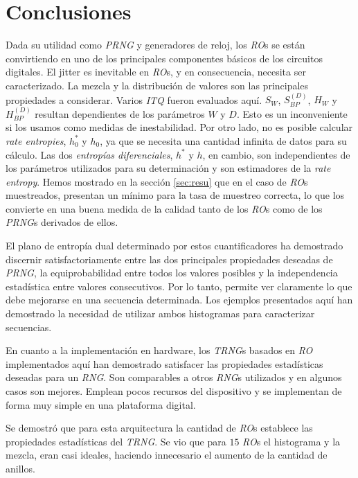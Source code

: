 \section{Conclusiones}

Dada su utilidad como \emph{PRNG} y generadores de reloj, los \emph{RO}s se están convirtiendo en uno de los principales componentes básicos de los circuitos digitales.
El jitter es inevitable en \emph{RO}s, y en consecuencia, necesita ser caracterizado.
La mezcla y la distribución de valores son las principales propiedades a considerar.
Varios \emph{ITQ} fueron evaluados aquí.
$S_W$, $S^{(D)}_{BP}$, $H_W$ y $H^{(D)}_{BP}$ resultan dependientes de los parámetros $W$ y $D$.
Esto es un inconveniente si los usamos como medidas de inestabilidad.
Por otro lado, no es posible calcular \emph{rate entropies}, $h_0^*$ y $h_0$, ya que se necesita una cantidad infinita de datos para su cálculo.
Las dos \emph{entropías diferenciales}, $h^*$ y $h$, en cambio, son independientes de los parámetros utilizados para su determinación y son estimadores de la \emph{rate entropy}.
Hemos mostrado en la sección \ref{sec:resu} que en el caso de \emph{RO}s muestreados, presentan un mínimo para la tasa de muestreo correcta, lo que los convierte en una buena medida de la calidad tanto de los \emph{RO}s como de los \emph{PRNG}s derivados de ellos.

El plano de entropía dual determinado por estos cuantificadores ha demostrado discernir satisfactoriamente entre las dos principales propiedades deseadas de \emph{PRNG}, la equiprobabilidad entre todos los valores posibles y la independencia estadística entre valores consecutivos.
Por lo tanto, permite ver claramente lo que debe mejorarse en una secuencia determinada.
Los ejemplos presentados aquí han demostrado la necesidad de utilizar ambos histogramas para caracterizar secuencias.

En cuanto a la implementación en hardware, los \emph{TRNG}s basados en \emph{RO} implementados aquí han demostrado satisfacer las propiedades estadísticas deseadas para un \emph{RNG}.
Son comparables a otros \emph{RNG}s utilizados y en algunos casos son mejores.
Emplean pocos recursos del dispositivo y se implementan de forma muy simple en una plataforma digital.

Se demostró que para esta arquitectura la cantidad de \emph{RO}s establece las propiedades estadísticas del \emph{TRNG}.
Se vio que para $15$ \emph{RO}s el histograma y la mezcla, eran casi ideales, haciendo innecesario el aumento de la cantidad de anillos.